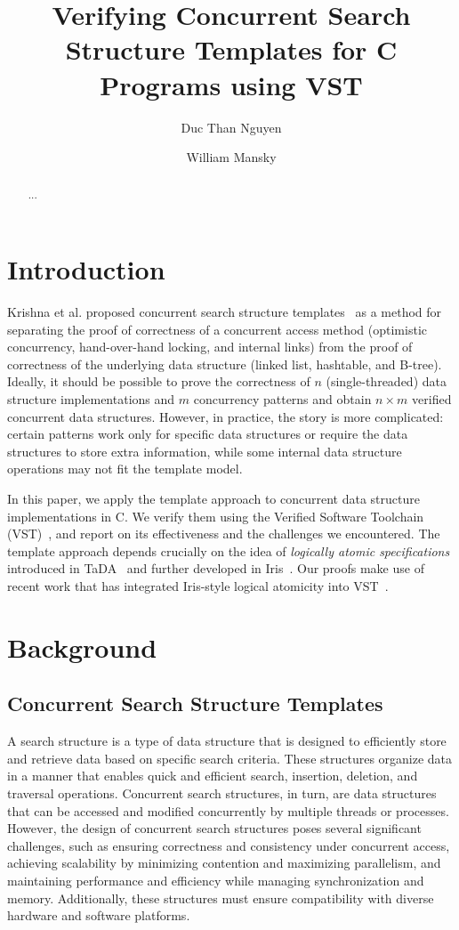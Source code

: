 \documentclass[a4paper,UKenglish,cleveref, autoref, thm-restate]{lipics-v2021}
\title{Verifying Concurrent Search Structure Templates for C Programs using VST} %
\author{Duc Than Nguyen}{University of Illinois at Chicago, USA \and \url{http://www.myhomepage.edu} }{johnqpublic@dummyuni.org}{https://orcid.org/0000-0002-1825-0097}{(Optional) author-specific funding acknowledgements}%
\author{William Mansky}{University of Illinois at Chicago, USA}{joanrpublic@dummycollege.org}{[orcid]}{[funding]}
\begin{document}
\maketitle

\begin{abstract}
... 
\end{abstract}

\section{Introduction}
\label{sec:introduction}
Krishna et al. proposed concurrent search structure templates~\cite{templates} as a method for separating the proof of correctness of a concurrent access method (optimistic concurrency, hand-over-hand locking, and internal links) from the proof of correctness of the underlying data structure (linked list, hashtable, and B-tree). Ideally, it should be possible to prove the correctness of $n$ (single-threaded) data structure implementations and $m$ concurrency patterns and obtain $n \times m$ verified concurrent data structures. However, in practice, the story is more complicated: certain patterns work only for specific data structures or require the data structures to store extra information, while some internal data structure operations may not fit the template model. 

In this paper, we apply the template approach to concurrent data structure implementations in C. We verify them using the Verified Software Toolchain (VST)~\cite{plfcc}, and report on its effectiveness and the challenges we encountered. The template approach depends crucially on the idea of \emph{logically atomic specifications} introduced in TaDA~\cite{tada} and further developed in Iris~\cite{iris}. Our proofs make use of recent work that has integrated Iris-style logical atomicity into VST~\cite{mansky2022bringing}.

\section{Background}
\subsection{Concurrent Search Structure Templates}
A search structure is a type of data structure that is designed to efficiently store and retrieve data based on specific search criteria. These structures organize data in a manner that enables quick and efficient search, insertion, deletion, and traversal operations. Concurrent search structures, in turn, are data structures that can be accessed and modified concurrently by multiple threads or processes. However, the design of concurrent search structures poses several significant challenges, such as ensuring correctness and consistency under concurrent access, achieving scalability by minimizing contention and maximizing parallelism, and maintaining performance and efficiency while managing synchronization and memory. Additionally, these structures must ensure compatibility with diverse hardware and software platforms.
\end{document}
